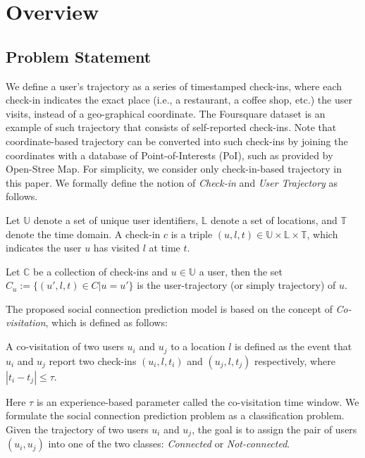 \section{Overview} \label{sec:overview}

\subsection{Problem Statement} \label{sec:problem}

We define a user's trajectory as a series of timestamped check-ins, where each check-in indicates the exact place (i.e., a restaurant, a coffee shop, etc.) the user visits, instead of a geo-graphical coordinate. The Foursquare dataset is an example of such trajectory that consists of self-reported check-ins. Note that coordinate-based trajectory can be converted into such check-ins by joining the coordinates with a database of Point-of-Interests (PoI), such as provided by Open-Stree Map. For simplicity, we consider only check-in-based trajectory in this paper. We formally define the notion of \textit{Check-in} and \textit{User Trajectory} as follows.

\begin{definition}[Check-in]
Let $\mathbb{U}$ denote a set of unique user identifiers, $\mathbb{L}$ denote a set of locations, and $\mathbb{T}$ denote the time domain. A check-in $c$ is a triple $(u, l, t) \in \mathbb{U} \times \mathbb{L} \times \mathbb{T}$, which indicates the user $u$ has visited $l$ at time $t$.
\end{definition}

\begin{definition}
Let $\mathbb{C}$ be a collection of check-ins and $u \in \mathbb{U}$ a user, then the set $C_u := \{ (u', l, t) \in C | u = u'\}$ is the user-trajectory (or simply trajectory) of $u$.
\end{definition}

The proposed social connection prediction model is based on the concept of \textit{Co-visitation}, which is defined as follows: 

\begin{definition}[Co-visitation]
A co-visitation of two users $u_i$ and $u_j$ to a location $l$ is defined as the event that $u_i$ and $u_j$ report two check-ins $(u_i, l, t_i)$ and $(u_j, l, t_j)$ respectively, where $| t_i - t_j| \leq \tau$.
\end{definition}

Here $\tau$ is an experience-based parameter called the co-visitation time window. We formulate the social connection prediction problem as a classification problem. Given the trajectory of two users $u_i$ and $u_j$, the goal is to assign the pair of users $(u_i, u_j)$ into one of the two classes: \textit{Connected} or \textit{Not-connected}.

